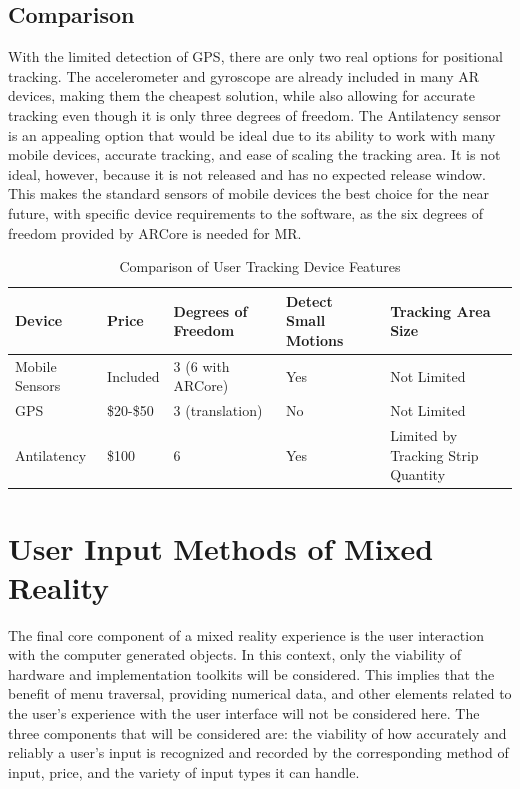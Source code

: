 \documentclass[10pt,draftclsnofoot,onecolumn,letterpaper]{IEEEtran}
\begin{document}
\subsection{Comparison}

With the limited detection of GPS, there are only two real options for positional tracking. The accelerometer and gyroscope are already included in many AR devices, making them the cheapest solution, while also allowing for accurate tracking even though it is only three degrees of freedom. The Antilatency sensor is an appealing option that would be ideal due to its ability to work with many mobile devices, accurate tracking, and ease of scaling the tracking area. It is not ideal, however, because it is not released and has no expected release window. This makes the standard sensors of mobile devices the best choice for the near future, with specific device requirements to the software, as the six degrees of freedom provided by ARCore is needed for MR.\par

\begin{table}[ht]
\begin{center}
\caption{Comparison of User Tracking Device Features}
\label{table:2}
 \begin{tabular}{|p{3cm}|p{2cm}|p{3cm}|p{4cm}|p{3cm}|}
 \hline
 Device & Price & Degrees of Freedom & Detect Small Motions & Tracking Area Size \\ [0.5ex]
 \hline\hline
 Mobile Sensors & Included & 3 (6 with ARCore) & Yes & Not Limited \\
 \hline
 GPS & \$20-\$50 & 3 (translation) & No & Not Limited \\
 \hline
 Antilatency & \$100 & 6 & Yes & Limited by Tracking Strip Quantity \\
 \hline
\end{tabular}
\end{center}
\end{table}

\section{User Input Methods of Mixed Reality}
The final core component of a mixed reality experience is the user interaction with the computer generated objects. In this context, only the viability of hardware and implementation toolkits will be considered. This implies that the benefit of menu traversal, providing numerical data, and other elements related to the user's experience with the user interface will not be considered here. The three components that will be considered are: the viability of how accurately and reliably a user's input is recognized and recorded by the corresponding method of input, price, and the variety of input types it can handle.\par
\end{document}

